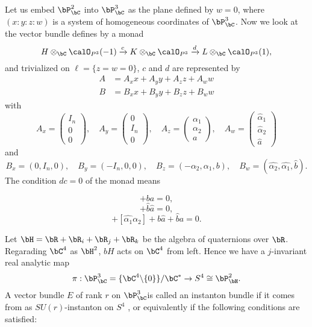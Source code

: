 Let us embed $\bP_{\bC}^{2}$ into $\bP_{\bC}^{3}$ as the plane defined by $w =0$, where $(x : y : z : w)$ is a system of homogeneous coordinates of $\bP_{\bC}^{3}$. Now we look at the vector bundle defines by a monad
$$
H \otimes_{\bC} \calO_{P^{3}}(-1) \xrightarrow{c} K \otimes_{\bC}\calO_{P^{3}} \xrightarrow{d} L \otimes_{\bC}\calO_{P^{3}}(1),
$$
and trivialized on $\ell =\{z=w=0\}$, $c$ and $d$ are represented by
\begin{align*}
A &= A_{x}x + A_{y}y + A_{z}z + A_{w}w\\
B &=B_{x}x + B_{y}y +B_{z}z+B_{w}w
\end{align*}
with
$$
A_{x} = \begin{pmatrix}
I_{n}\\
0\\
0
\end{pmatrix}
,\quad A_{y}=
\begin{pmatrix}
0\\
I_{n}\\
0
\end{pmatrix}
,\quad A_{z}=
\begin{pmatrix}
\alpha_{1}\\
\alpha_{2}\\
a
\end{pmatrix}
,\quad A_{w} =
\begin{pmatrix}
\hat{\alpha}_{1}\\
\hat{\alpha}_{2}\\
\hat{a}
\end{pmatrix}
$$
and
$$
B_{x}= (0,I_{n}, 0), \quad B_{y}=(-I_{n}, 0,0), \quad B_{z} =(-\alpha_{2}, \alpha_{1}, b), \quad B_{w} =(\hat{\alpha_{2}}, \hat{\alpha_{1}}, \hat{b}).
$$
The condition $dc =0$ of the monad means

\begin{equation}
[\alpha_{1}, \alpha_{2}] +ba = 0,\tag{1.4.1}\label{art12-eq-1.4.1}
\end{equation}
\begin{equation}
[\hat{\alpha_{1}}, \hat{\alpha_{2}}] +\hat{b}\hat{a} = 0,\tag{1.4.2}\label{art12-eq-1.4.2}
\end{equation}
\begin{equation}
[\alpha_{1}, \hat{\alpha_{2}}] +[\hat{\alpha_{1}}\alpha_{2}] + b \hat{a}+ \hat{b}a = 0.\tag{1.4.3}\label{art12-eq-1.4.3}
\end{equation}

Let $\bH =\bR +\bR_{i} + \bR_{j} + \bR_{k}$ be the algebra of quaternions over $\bR$. Regarading $\bC^{4}$ as $\bH^{2}$, $bH$ acts on $\bC^{4}$ from left. Hence we have a $j$-invariant real analytic map
$$
\pi : \bP^{3}_{\bC} = \{\bC^{4}\backslash \{0\}\}/{\bC}^{*} \rightarrow S^{4} \cong \bP_{\bH}^{2}.
$$
A vector bundle $E$ of rank $r$ on $\bP_{\bC}^{3}$is called an instanton bundle if it comes from as $SU(r)$-instanton on $S^{4}$ , or equivalently if the following conditions are satisfied:


